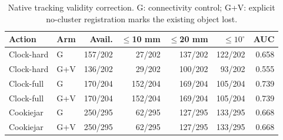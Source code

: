 \begin{table}[t]\centering\scriptsize
\caption{Native tracking validity correction. G: connectivity control; G+V: explicit no-cluster registration marks the existing object lost.}
\label{tab:no-cluster-validity}
\begin{tabular}{llrrrrr}\toprule
Action & Arm & Avail. & $\leq$10 mm & $\leq$20 mm & $\leq10^\circ$ & AUC\\\midrule
Clock-hard & G & 157/202 & 27/202 & 137/202 & 122/202 & 0.658\\
Clock-hard & G+V & 136/202 & 29/202 & 100/202 & 93/202 & 0.555\\
Clock-full & G & 170/204 & 152/204 & 169/204 & 105/204 & 0.739\\
Clock-full & G+V & 170/204 & 152/204 & 169/204 & 105/204 & 0.739\\
Cookiejar & G & 250/295 & 62/295 & 127/295 & 133/295 & 0.668\\
Cookiejar & G+V & 250/295 & 62/295 & 127/295 & 133/295 & 0.668\\
\bottomrule\end{tabular}\end{table}
